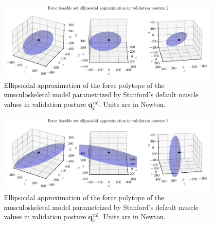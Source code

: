 \begin{figure}[!htb]
    \centering
    \captionsetup{justification=centering}
    \begin{minipage}{\linewidth}
        \centering
        \includegraphics[trim={0 0 0 0}, clip, width=1\linewidth]{img/chapter_4/reconstruction_stanford_imgs/STANFORD_ELLIPSOID_POSTURE_VAL_02.pdf}
    \end{minipage}
    \caption{Ellipsoidal approximation of the force polytope of the musculoskeletal model parametrized by Stanford's default muscle values in validation posture $\mathbf{q}_2^{\text{val}}$. Units are in Newton.}
    \label{fig:ellipsoid_val_pose_2}
\end{figure}

\begin{figure}[!htb]
    \centering
    \captionsetup{justification=centering}
    \begin{minipage}{\linewidth}
        \centering
        \includegraphics[trim={0 0 0 0}, clip, width=1\linewidth]{img/chapter_4/reconstruction_stanford_imgs/STANFORD_ELLIPSOID_POSTURE_VAL_03.pdf}
    \end{minipage}
    \caption{Ellipsoidal approximation of the force polytope of the musculoskeletal model parametrized by Stanford's default muscle values in validation posture $\mathbf{q}_3^{\text{val}}$. Units are in Newton.}
    \label{fig:ellipsoid_val_pose_3}
\end{figure}


